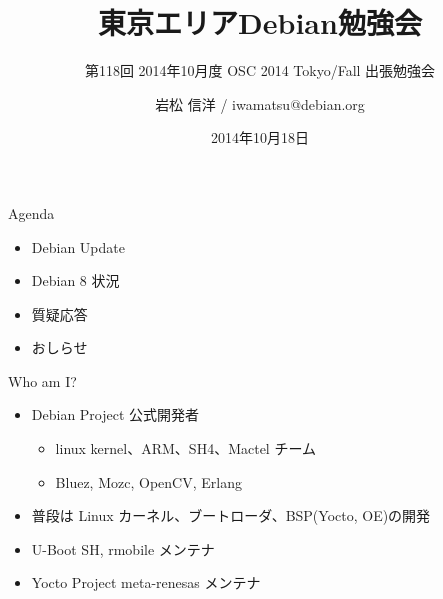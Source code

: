 \title{東京エリアDebian勉強会}
\subtitle{第118回 2014年10月度 OSC 2014 Tokyo/Fall 出張勉強会}
\author{岩松 信洋 / iwamatsu@debian.org}
\date{2014年10月18日}



\begin{frame}
\titlepage{}
\end{frame}

\begin{frame}{Agenda}
  \begin{itemize}
   \item Debian Update
   \item Debian 8 状況
   \item 質疑応答
   \item おしらせ
  \end{itemize}
\end{frame}

%
%

\begin{frame}{Who am I?}

\begin{itemize}
\item Debian Project 公式開発者
\begin{itemize}
\item linux kernel、ARM、SH4、Mactel チーム
\item Bluez, Mozc, OpenCV, Erlang
\end{itemize}
\item 普段は Linux カーネル、ブートローダ、BSP(Yocto, OE)の開発
\item U-Boot SH, rmobile メンテナ
\item Yocto Project meta-renesas メンテナ
\end{itemize}

\end{frame}

